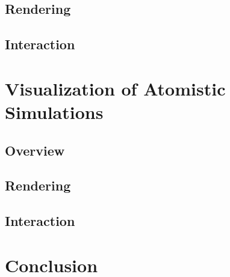 \documentclass[10pt,twocolumn,letterpaper]{article}
\begin{document}
\subsection{Rendering}
\subsection{Interaction}

\section{Visualization of Atomistic Simulations}
\subsection{Overview}
\subsection{Rendering}
\subsection{Interaction}

\section{Conclusion}

{\small


}
\end{document}
